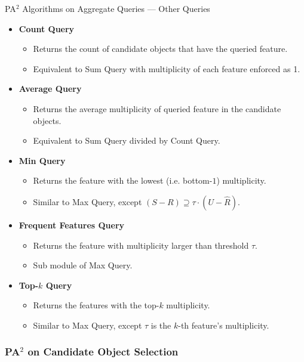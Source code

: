 \documentclass[xcolor={dvipsnames},aspectratio=169,10pt]{beamer}
\begin{document}
\begin{frame}{PA$^2$ Algorithms on Aggregate Queries --- Other Queries}
  \begin{itemize}
    \item \textbf{Count Query}
      \begin{itemize}
        \item Returns the count of candidate objects that have the queried feature.
        \item Equivalent to \alert{Sum Query} with multiplicity of each feature enforced as 1.
      \end{itemize}
    \item \textbf{Average Query}
      \begin{itemize}
        \item Returns the average multiplicity of queried feature in the candidate objects.
        \item Equivalent to \alert{Sum Query} divided by \alert{Count Query}.
      \end{itemize}
    \item \textbf{Min Query}
      \begin{itemize}
        \item Returns the feature with the lowest (i.e. bottom-$1$) multiplicity.
        \item Similar to \alert{Max Query}, except $(S - R) \supseteq {\tau} \cdot (U - \widehat{R})$.
      \end{itemize}
    \item \textbf{Frequent Features Query}
      \begin{itemize}
        \item Returns the feature with multiplicity larger than threshold $\tau$.
        \item Sub module of \alert{Max Query}.
      \end{itemize}
    \item \textbf{Top-$k$ Query}
      \begin{itemize}
        \item Returns the features with the top-$k$ multiplicity.
        \item Similar to \alert{Max Query}, except $\tau$ is the $k$-th feature's multiplicity.
      \end{itemize}
  \end{itemize}
\end{frame}

\subsubsection{PA$^2$ on Candidate Object Selection}
\end{document}

